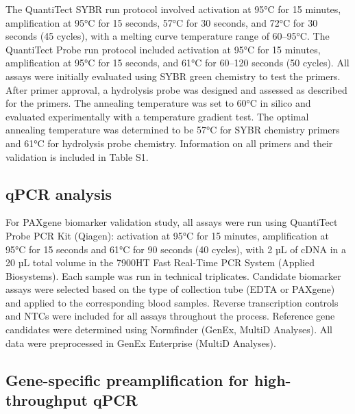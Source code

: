 The QuantiTect SYBR run protocol involved activation at 95°C for 15 minutes, amplification at 95°C for 15 seconds, 57°C for 30 seconds, and 72°C for 30 seconds (45 cycles), with a melting curve temperature range of 60–95°C. The QuantiTect Probe run protocol included activation at 95°C for 15 minutes, amplification at 95°C for 15 seconds, and 61°C for 60–120 seconds (50 cycles). All assays were initially evaluated using SYBR green chemistry to test the primers. After primer approval, a hydrolysis probe was designed and assessed as described for the primers. The annealing temperature was set to 60°C in silico and evaluated experimentally with a temperature gradient test. The optimal annealing temperature was determined to be 57°C for SYBR chemistry primers and 61°C for hydrolysis probe chemistry. Information on all primers and their validation is included in Table S1.

\subsection*{qPCR analysis}
For PAXgene biomarker validation study, all assays were run using QuantiTect Probe PCR Kit (Qiagen): activation at 95°C for 15 minutes, amplification at 95°C for 15 seconds and 61°C for 90 seconds (40 cycles), with 2 µL of cDNA in a 20 µL total volume in the 7900HT Fast Real-Time PCR System (Applied Biosystems). Each sample was run in technical triplicates. Candidate biomarker assays were selected based on the type of collection tube (EDTA or PAXgene) and applied to the corresponding blood samples. Reverse transcription controls and NTCs were included for all assays throughout the process. Reference gene candidates were determined using Normfinder (GenEx, MultiD Analyses). All data were preprocessed in GenEx Enterprise (MultiD Analyses).

\subsection*{Gene-specific preamplification for high-throughput qPCR}